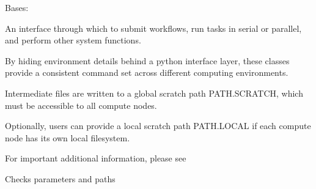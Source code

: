 \documentclass[letterpaper,10pt,english]{sphinxmanual}
\begin{document}
\begin{fulllineitems}
\label{\detokenize{ref/seisflows.system:seisflows.system.pbs_lg.pbs_lg}}
Bases: {\hyperref[\detokenize{ref/seisflows.system:seisflows.system.base.base}]{}}

An interface through which to submit workflows, run tasks in serial or
parallel, and perform other system functions.

By hiding environment details behind a python interface layer, these
classes provide a consistent command set across different computing
environments.

Intermediate files are written to a global scratch path PATH.SCRATCH,
which must be accessible to all compute nodes.

Optionally, users can provide a local scratch path PATH.LOCAL if each
compute node has its own local filesystem.

For important additional information, please see

\begin{fulllineitems}
\label{\detokenize{ref/seisflows.system:seisflows.system.pbs_lg.pbs_lg.check}}
Checks parameters and paths

\end{fulllineitems}


\begin{fulllineitems}
\label{\detokenize{ref/seisflows.system:seisflows.system.pbs_lg.pbs_lg.job_array_args}}
\end{fulllineitems}


\begin{fulllineitems}
\label{\detokenize{ref/seisflows.system:seisflows.system.pbs_lg.pbs_lg.job_array_cmd}}
\end{fulllineitems}


\end{fulllineitems}
\end{document}

